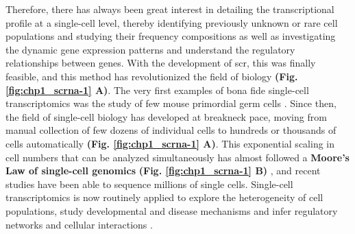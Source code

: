 Therefore, there has always been great interest in detailing the transcriptional profile at a single-cell level, thereby identifying previously unknown or rare cell populations and studying their frequency compositions as well as investigating the dynamic gene expression patterns and understand the regulatory relationships between genes. With the development of \gls{scr}, this was finally feasible, and this method has revolutionized the field of biology \textbf{(Fig. \ref{fig:chp1_scrna-1} A)}. The very first examples of bona fide single-cell transcriptomics was the study of few mouse primordial germ cells \textbf{\cite{tang_mrna-seq_2009}}. Since then, the field of single-cell biology has developed at breakneck pace, moving from manual collection of few dozens of individual cells to hundreds or thousands of cells automatically \textbf{(Fig. \ref{fig:chp1_scrna-1} A)}. This exponential scaling in cell numbers that can be analyzed simultaneously has almost followed a \textbf{Moore’s Law of single-cell genomics} \textbf{(Fig. \ref{fig:chp1_scrna-1} B)} \textbf{\cite{aldridge_single_2020}}, and recent studies have been able to sequence millions of single cells. Single-cell transcriptomics is now routinely applied to explore the heterogeneity of cell populations, study developmental \textbf{\cite{cao_single-cell_2019,la_manno_molecular_2021}} and disease mechanisms \textbf{\cite{jordao_single-cell_2019,he_single-cell_2021}} and infer regulatory networks \textbf{\cite{wang_cell-type-specific_2020,fei_systematic_2022}} and cellular interactions \textbf{\cite{cherry_computational_2021,shamsi_comprehensive_2023}}. 



